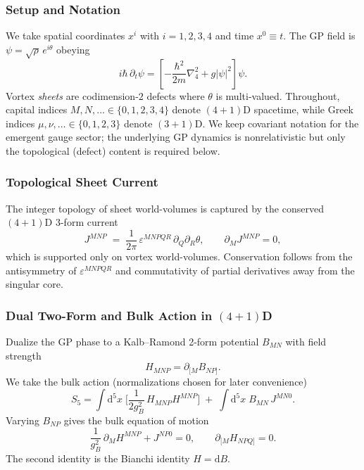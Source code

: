 \subsubsection{Setup and Notation}
We take spatial coordinates $x^i$ with $i=1,2,3,4$ and time $x^0\equiv t$. The GP field is $\psi=\sqrt{\rho}\,e^{i\theta}$ obeying
\begin{equation}
i\hbar\,\partial_t \psi=\left[-\frac{\hbar^2}{2m}\nabla_4^2+g|\psi|^2\right]\psi.
\end{equation}
Vortex \emph{sheets} are codimension-$2$ defects where $\theta$ is multi-valued. Throughout, capital indices $M,N,\ldots\in\{0,1,2,3,4\}$ denote $(4{+}1)$D spacetime, while Greek indices $\mu,\nu,\ldots\in\{0,1,2,3\}$ denote $(3{+}1)$D. We keep covariant notation for the emergent gauge sector; the underlying GP dynamics is nonrelativistic but only the topological (defect) content is required below.

\subsubsection{Topological Sheet Current}
The integer topology of sheet world-volumes is captured by the conserved $(4{+}1)$D 3-form current
\begin{equation}
J^{MNP} \;=\;\frac{1}{2\pi}\,\varepsilon^{MNPQR}\,\partial_Q\partial_R\theta,
\qquad \partial_M J^{MNP}=0,
\end{equation}
which is supported only on vortex world-volumes. Conservation follows from the antisymmetry of $\varepsilon^{MNPQR}$ and commutativity of partial derivatives away from the singular core.

\subsubsection{Dual Two-Form and Bulk Action in $(4{+}1)$D}
Dualize the GP phase to a Kalb--Ramond 2-form potential $B_{MN}$ with field strength
\begin{equation}
H_{MNP}=\partial_{[M}B_{NP]}.
\end{equation}
We take the bulk action (normalizations chosen for later convenience)
\begin{equation}
S_{5}=\int\! \mathrm d^{5}x\;\Big[\frac{1}{2g_B^2}\,H_{MNP}H^{MNP}\Big]\;+\;\int\!\mathrm d^{5}x\; B_{MN}\,J^{MN0}.
\label{eq:S5}
\end{equation}
Varying $B_{NP}$ gives the bulk equation of motion
\begin{equation}
\frac{1}{g_B^2}\,\partial_M H^{MNP}+J^{NP0}=0,
\qquad \partial_{[M}H_{NPQ]}=0.
\end{equation}
The second identity is the Bianchi identity $H=\mathrm dB$.

